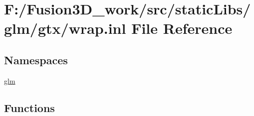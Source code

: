 \hypertarget{wrap_8inl}{}\section{F\+:/\+Fusion3\+D\+\_\+work/src/static\+Libs/glm/gtx/wrap.inl File Reference}
\label{wrap_8inl}
\subsection*{Namespaces}
\begin{DoxyCompactItemize}
\item 
 \hyperlink{namespaceglm}{glm}
\end{DoxyCompactItemize}
\subsection*{Functions}
